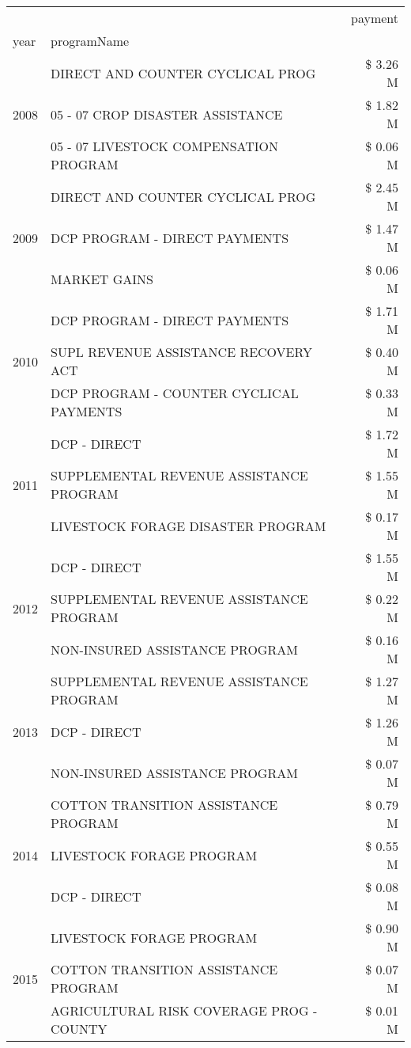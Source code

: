 \begin{tabular}{llr}
\toprule
 &  & payment \\
year & programName &  \\
\midrule
\multirow[t]{3}{*}{2008} & DIRECT AND COUNTER CYCLICAL PROG & \$ 3.26 M \\
 & 05 - 07 CROP DISASTER ASSISTANCE & \$ 1.82 M \\
 & 05 - 07 LIVESTOCK COMPENSATION PROGRAM & \$ 0.06 M \\
\cline{1-3}
\multirow[t]{3}{*}{2009} & DIRECT AND COUNTER CYCLICAL PROG & \$ 2.45 M \\
 & DCP PROGRAM - DIRECT PAYMENTS & \$ 1.47 M \\
 & MARKET GAINS & \$ 0.06 M \\
\cline{1-3}
\multirow[t]{3}{*}{2010} & DCP PROGRAM - DIRECT PAYMENTS & \$ 1.71 M \\
 & SUPL REVENUE ASSISTANCE RECOVERY ACT & \$ 0.40 M \\
 & DCP PROGRAM - COUNTER CYCLICAL PAYMENTS & \$ 0.33 M \\
\cline{1-3}
\multirow[t]{3}{*}{2011} & DCP - DIRECT & \$ 1.72 M \\
 & SUPPLEMENTAL REVENUE ASSISTANCE PROGRAM & \$ 1.55 M \\
 & LIVESTOCK FORAGE DISASTER PROGRAM & \$ 0.17 M \\
\cline{1-3}
\multirow[t]{3}{*}{2012} & DCP - DIRECT & \$ 1.55 M \\
 & SUPPLEMENTAL REVENUE ASSISTANCE PROGRAM & \$ 0.22 M \\
 & NON-INSURED ASSISTANCE PROGRAM & \$ 0.16 M \\
\cline{1-3}
\multirow[t]{3}{*}{2013} & SUPPLEMENTAL REVENUE ASSISTANCE PROGRAM & \$ 1.27 M \\
 & DCP - DIRECT & \$ 1.26 M \\
 & NON-INSURED ASSISTANCE PROGRAM & \$ 0.07 M \\
\cline{1-3}
\multirow[t]{3}{*}{2014} & COTTON TRANSITION ASSISTANCE PROGRAM & \$ 0.79 M \\
 & LIVESTOCK FORAGE PROGRAM & \$ 0.55 M \\
 & DCP - DIRECT & \$ 0.08 M \\
\cline{1-3}
\multirow[t]{3}{*}{2015} & LIVESTOCK FORAGE PROGRAM & \$ 0.90 M \\
 & COTTON TRANSITION ASSISTANCE PROGRAM & \$ 0.07 M \\
 & AGRICULTURAL RISK COVERAGE PROG - COUNTY & \$ 0.01 M \\
\cline{1-3}

\end{tabular}
